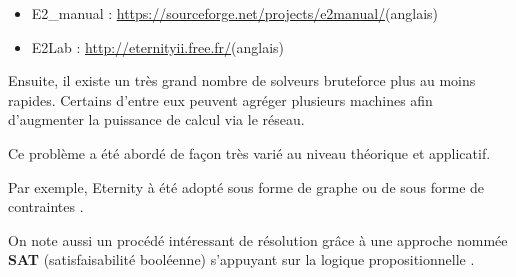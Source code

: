 	\begin{itemize}
		\item E2\_manual : \url{https://sourceforge.net/projects/e2manual/}(anglais)
		\item E2Lab : \url{http://eternityii.free.fr/}(anglais)
	\end{itemize}
	
	Ensuite, il existe un très grand nombre de solveurs bruteforce plus au moins rapides. Certains d'entre eux peuvent agréger plusieurs machines afin d'augmenter la puissance de calcul via le réseau.
	
	Ce problème a été abordé de façon très varié au niveau théorique et applicatif.
	
	Par exemple, Eternity à été adopté sous forme de graphe \cite{patey2010eternity} ou de sous forme de contraintes \cite{benoist2008programmation}.
	
	On note aussi un procédé intéressant de résolution grâce à une approche nommée \textbf{SAT} (satisfaisabilité booléenne) s'appuyant sur la logique propositionnelle \cite{cuvillierresolution} \cite{heule2009solving}.